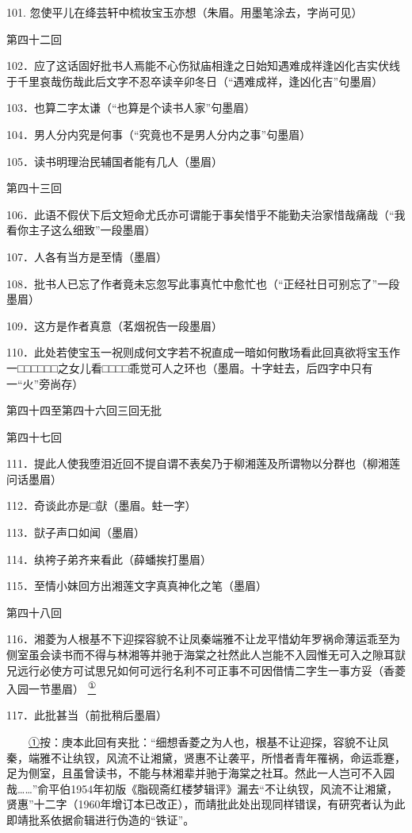 101. 忽使平儿在绛芸轩中梳妆宝玉亦想{（\kaishu 朱眉。用墨笔涂去，字尚可见）}

第四十二回

102．应了这话固好批书人焉能不心伤狱庙相逢之日始知遇难成祥逢凶化吉实伏线于千里哀哉伤哉此后文字不忍卒读辛卯冬日{（\kaishu ``遇难成祥，逢凶化吉''句墨眉）}

103．也算二字太谦{（\kaishu ``也算是个读书人家''句墨眉）}

104．男人分内究是何事{（\kaishu ``究竟也不是男人分内之事''句墨眉）}

105．读书明理治民辅国者能有几人{（\kaishu 墨眉）}

第四十三回

106．此语不假伏下后文短命尤氏亦可谓能于事矣惜乎不能勤夫治家惜哉痛哉{（\kaishu ``我看你主子这么细致''一段墨眉）}

107．人各有当方是至情{（\kaishu 墨眉）}

108．批书人已忘了作者竟未忘忽写此事真忙中愈忙也{（\kaishu ``正经社日可别忘了''一段墨眉）}

109．这方是作者真意{（\kaishu 茗烟祝告一段墨眉）}

110．此处若使宝玉一祝则成何文字若不祝直成一暗如何散场看此回真欲将宝玉作一□□□□□□之女儿看□□□□乖觉可人之环也{（\kaishu 墨眉。十字蛀去，后四字中只有一``火''旁尚存）}

第四十四至第四十六回三回无批

第四十七回

111．提此人使我堕泪近回不提自谓不表矣乃于柳湘莲及所谓物以分群也{（\kaishu 柳湘莲问话墨眉）}

112．奇谈此亦是□獃{（\kaishu 墨眉。蛀一字）}

113．獃子声口如闻{（\kaishu 墨眉）}

114．纨袴子弟齐来看此{（\kaishu 薛蟠挨打墨眉）}

115．至情小妹回方出湘莲文字真真神化之笔{（\kaishu 墨眉）}

第四十八回

116．湘菱为人根基不下迎探容貌不让凤秦端雅不让龙平惜幼年罗祸命薄运乖至为侧室虽会读书而不得与林湘等并驰于海棠之社然此人岂能不入园惟无可入之隙耳獃兄远行必使方可试思兄如何可远行名利不可正事不可因借情二字生一事方妥{（\kaishu 香菱入园一节墨眉）}
\href{../Text/part0087.html\#lnkback_1_a}{\textsuperscript{①}}\href{../Text/part0087.html\#lnkback_t_a}{}

117．此批甚当{（\kaishu 前批稍后墨眉）}

{　　\href{../Text/part0087.html\#navto_1_a}{①}按：庚本此回有夹批：``细想香菱之为人也，根基不让迎探，容貌不让凤秦，端雅不让纨钗，风流不让湘黛，贤惠不让袭平，所惜者青年罹祸，命运乖蹇，足为侧室，且虽曾读书，不能与林湘辈并驰于海棠之社耳。然此一人岂可不入园哉\ldots{}\ldots{}''俞平伯1954年初版《脂砚斋红楼梦辑评》漏去``不让纨钗，风流不让湘黛，贤惠''十二字（1960年增订本已改正），而靖批此处出现同样错误，有研究者认为此即靖批系依据俞辑进行伪造的``铁证''。}

